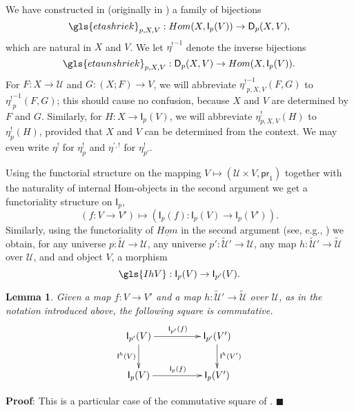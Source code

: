 \documentclass[12pt]{article}
\numberwithin{equation}{section}
\newenvironment{myproof}{{\bf Proof}:}{$\blacksquare$ \vskip 5mm }
\newtheorem{lemma}[proposition]{Lemma}
\newcommand{\sr}{\rightarrow}
\newcommand{\uu}{\underline}
\newcommand{\iHom}{\uu{Hom}}
\newcommand{\wt}{\widetilde}
\newcommand{\U}{\mathcal{U}}
\newcommand{\D}{\mathsf{D}}
\newcommand{\I}{\mathsf{I}}
\newcommand{\etashriek}{\eta^!}
\newcommand{\etaunshriek}{{\etashriek}^{-1}}
\newcommand{\pr}{\mathsf{pr}}
\begin{document}
We have constructed in \cite[Construction 2.6.4]{presheavesOb} (originally in \cite[Construction 3.9]{fromunivwithPi}) a family of
bijections
%
$$\gls{etashriek}_{p,X,V}:Hom(X,\I_p(V))\sr \D_p(X,V),$$
%
which are natural in $X$ and $V$.  We let $\etaunshriek$ denote the inverse bijections
%
$$\gls{etaunshriek}_{p,X,V}:\D_p(X,V)\sr Hom(X,\I_p(V)).$$
For $F:X\sr \U$ and $G : (X;F) \sr V$, we will abbreviate
$\etaunshriek_{p,X,V}(F,G)$ to $\etaunshriek_p(F,G)$; this should cause no
confusion, because $X$ and $V$ are determined by $F$ and $G$.
Similarly, for $H : X \sr \I_p(V)$, we will abbreviate $\etashriek_{p,X,V}(H)$
to $\etashriek_p(H)$, provided that $X$ and $V$ can be determined from the context.
We may even write $\etashriek$ for $\etashriek_p$ and $\eta^{',!}$ for $\etashriek_{p'}$.

Using the functorial structure on the mapping $V\mapsto (\U\times V,\pr_1)$
together with the naturality of internal Hom-objects in the second argument we
get a functoriality structure on $\I_p$,
%
\[(f:V\sr V')\mapsto (\I_p(f):\I_p(V)\sr \I_p(V')).\]
%
Similarly, using the functoriality of $\iHom$ in the second argument (see,
e.g., \cite[\S 4.2]{presheavesOb}) we obtain, for any universe $p:\wt{\U}\sr \U$,
any universe $p':\wt{\U}'\sr \U$, any map $h:\wt{\U}'\sr \wt{\U}$ over $\U$, and and object $V$, a morphism
%
\[\gls{IhV} : \I_p(V) \sr \I_{p'}(V).\]
%
\begin{lemma}
  \label{2015.04.10.l2}
  Given a map $f:V\sr V'$ and a map $h:\wt{\U}'\sr \wt{\U}$ over $\U$,
  as in the notation introduced above, the following square is commutative.
%
$$
\begin{xy}
          \xymatrix@C=4pc{ \I_{p'}(V) \ar[r]^{\I_{p'}(f)} \ar[d]_{\I^h(V)} &
            \I_{p'}(V') \ar[d]^{\I^h(V')}\\ \I_p(V) \ar[r]^{\I_p(f)} & \I_p(V') }
\end{xy}
$$
\end{lemma}
%
\begin{myproof}
This is a particular case of the commutative square of \cite[Lemma 4.1.5]{presheavesOb}.
\end{myproof}
\end{document}
